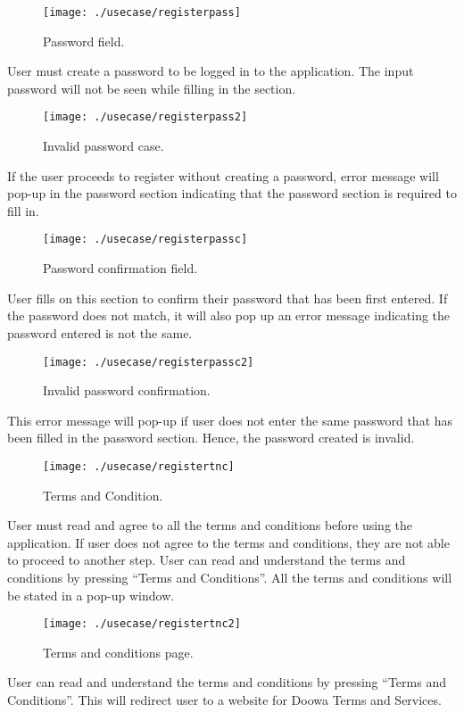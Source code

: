 \documentclass[conference]{IEEEtran}
\begin{document}
\begin{figure}[h!]
\texttt{[image: ./usecase/registerpass]}
\centering
\caption{Password field.}
\end{figure}
\par User must create a password to be logged in to the application. The input password will not be seen while filling in the section. 
\begin{figure}[h!]
\texttt{[image: ./usecase/registerpass2]}
\centering
\caption{Invalid password case.}
\end{figure}
\par If the user proceeds to register without creating a password, error message will pop-up in the password section indicating that the password section is required to fill in. 
\begin{figure}[h!]
\texttt{[image: ./usecase/registerpassc]}
\centering
\caption{Password confirmation field.}
\end{figure}
\par User fills on this section to confirm their password that has been first entered. If the password does not match, it will also pop up an error message indicating the password entered is not the same.
\begin{figure}[h!]
\texttt{[image: ./usecase/registerpassc2]}
\centering
\caption{Invalid password confirmation.}
\end{figure}
\par This error message will pop-up if user does not enter the same password that has been filled in the password section. Hence, the password created is invalid.
\begin{figure}[h!]
\texttt{[image: ./usecase/registertnc]}
\centering
\caption{Terms and Condition.}
\end{figure}
\par User must read and agree to all the terms and conditions before using the application. If user does not agree to the terms and conditions, they are not able to proceed to another step. User can read and understand the terms and conditions by pressing “Terms and Conditions”. All the terms and conditions will be stated in a pop-up window.
\begin{figure}[h!]
\texttt{[image: ./usecase/registertnc2]}
\centering
\caption{Terms and conditions page.}
\end{figure}
\par User can read and understand the terms and conditions by pressing “Terms and Conditions”. This will redirect user to a website for Doowa Terms and Services.
\end{document}
